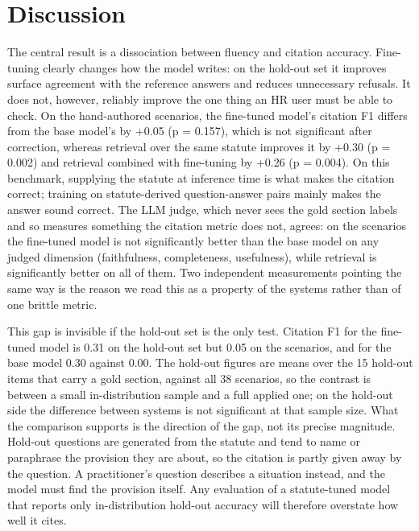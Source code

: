 \documentclass[11pt,a4paper]{article}
\begin{document}
\section{Discussion}
The central result is a dissociation between fluency and citation accuracy. Fine-tuning clearly changes how the model writes: on the hold-out set it improves surface agreement with the reference answers and reduces unnecessary refusals. It does not, however, reliably improve the one thing an HR user must be able to check. On the hand-authored scenarios, the fine-tuned model's citation F1 differs from the base model's by +0.05 (p = 0.157), which is not significant after correction, whereas retrieval over the same statute improves it by +0.30 (p = 0.002) and retrieval combined with fine-tuning by +0.26 (p = 0.004). On this benchmark, supplying the statute at inference time is what makes the citation correct; training on statute-derived question-answer pairs mainly makes the answer sound correct. The LLM judge, which never sees the gold section labels and so measures something the citation metric does not, agrees: on the scenarios the fine-tuned model is not significantly better than the base model on any judged dimension (faithfulness, completeness, usefulness), while retrieval is significantly better on all of them. Two independent measurements pointing the same way is the reason we read this as a property of the systems rather than of one brittle metric.

This gap is invisible if the hold-out set is the only test. Citation F1 for the fine-tuned model is 0.31 on the hold-out set but 0.05 on the scenarios, and for the base model 0.30 against 0.00. The hold-out figures are means over the 15 hold-out items that carry a gold section, against all 38 scenarios, so the contrast is between a small in-distribution sample and a full applied one; on the hold-out side the difference between systems is not significant at that sample size. What the comparison supports is the direction of the gap, not its precise magnitude. Hold-out questions are generated from the statute and tend to name or paraphrase the provision they are about, so the citation is partly given away by the question. A practitioner's question describes a situation instead, and the model must find the provision itself. Any evaluation of a statute-tuned model that reports only in-distribution hold-out accuracy will therefore overstate how well it cites.
\end{document}

